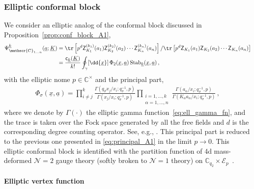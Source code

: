 \subsubsection{Elliptic conformal block}

We consider an elliptic analog of the conformal block discussed in Proposition~\ref{prop:conf_block_A1},
\begin{align}
        \Psi_{\mathscr{C}_{1\ldots n}}^{\underline{k}}(\underline{a};\underline{K}) & = \tr \left[ p^{d} \mathsf{Z}^{(k_1)}_{K_1}(a_1) \mathsf{Z}^{(k_2)}_{K_2}(a_2) \cdots \mathsf{Z}^{(k_n)}_{K_n}(a_n) \right] / \tr \left[ p^{d} \mathsf{Z}_{K_1}(a_1) \mathsf{Z}_{K_2}(a_2) \cdots \mathsf{Z}_{K_n}(a_n) \right]
        \nonumber \\ 
        & = \frac{\mathsf{c}_{\underline{k}}(\underline{K})}{k!} \oint_\gamma [\dd{\underline{x}}] \, \Phi_{2}(\underline{x},\underline{a}) \operatorname{Stab}_{\underline{k}}        (\underline{x},\underline{a})
        \, ,
\end{align}
with the elliptic nome $p \in \mathbb{C}^\times$ and the principal part,
\begin{align}
    \Phi_{\sigma}(\underline{x},\underline{a}) = \prod_{i \neq j}^k \frac{\Gamma(q_{\bar{\sigma}} x_j/x_i;q_\sigma^{-1},p)}{\Gamma(x_j/x_i;q_\sigma^{-1},p)} \prod_{\substack{i=1,\ldots,k \\ \alpha=1,\ldots,n}} \frac{\Gamma( a_\alpha/x_i;q_\sigma^{-1},p)}{\Gamma(K_\alpha a_\alpha/x_i;q_\sigma^{-1},p)} 
    \, ,
\end{align}
where we denote by $\Gamma(\cdot)$ the elliptic gamma function~\eqref{eq:ell_gamma_fn}, and the trace is taken over the Fock space generated by all the free fields and $d$ is the corresponding degree counting operator. 
See, e.g., \cite{Kimura:2016dys}.
This principal part is reduced to the previous one presented in \eqref{eq:principal_A1} in the limit $p \to 0$.
This elliptic conformal block is identified with the partition function of 4d mass-deformed $\mathcal{N} = 2$ gauge theory (softly broken to $\mathcal{N}=1$ theory) on $\mathbb{C}_{q_2} \times \mathcal{E}_p$~\cite{Longhi:2019hdh}.

\paragraph{Elliptic vertex function}

